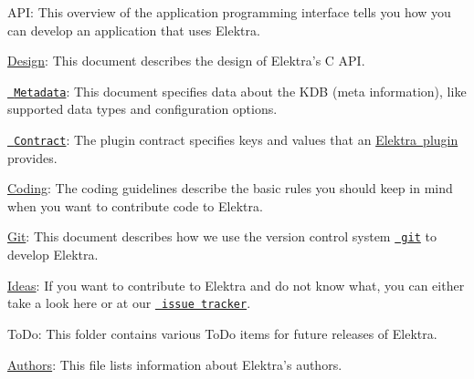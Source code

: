 \begin{DoxyItemize}
\item A\+PI\+: This overview of the application programming interface tells you how you can develop an application that uses Elektra.
\item \mbox{\hyperlink{doc_DESIGN_md}{Design}}\+: This document describes the design of Elektra’s C A\+PI.
\end{DoxyItemize}


\begin{DoxyItemize}
\item \href{/home/mpranj/workspace/libelektra/doc/METADATA.ini}{\texttt{ Metadata}}\+: This document specifies data about the K\+DB (meta information), like supported data types and configuration options.
\item \href{/home/mpranj/workspace/libelektra/doc/CONTRACT.ini}{\texttt{ Contract}}\+: The plugin contract specifies keys and values that an \mbox{\hyperlink{src_plugins_README_md}{Elektra plugin}} provides.
\end{DoxyItemize}


\begin{DoxyItemize}
\item \mbox{\hyperlink{doc_CODING_md}{Coding}}\+: The coding guidelines describe the basic rules you should keep in mind when you want to contribute code to Elektra.
\item \mbox{\hyperlink{doc_GIT_md}{Git}}\+: This document describes how we use the version control system \href{https://git-scm.com}{\texttt{ git}} to develop Elektra.
\item \mbox{\hyperlink{doc_IDEAS_md}{Ideas}}\+: If you want to contribute to Elektra and do not know what, you can either take a look here or at our \href{http://libelektra.org/issues}{\texttt{ issue tracker}}.
\item To\+Do\+: This folder contains various To\+Do items for future releases of Elektra.
\item \mbox{\hyperlink{doc_AUTHORS_md}{Authors}}\+: This file lists information about Elektra’s authors.
\end{DoxyItemize}



